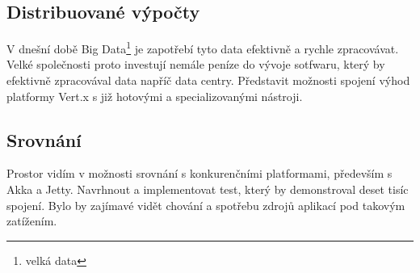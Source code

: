 \subsection{Distribuované výpočty}

V dnešní době Big Data\footnote{velká data} je zapotřebí tyto data efektivně a rychle zpracovávat. Velké společnosti proto investují nemále peníze do vývoje sotfwaru, který by efektivně zpracovával data napříč data centry. Představit možnosti spojení výhod platformy Vert.x s již hotovými a specializovanými nástroji.

\subsection{Srovnání}

Prostor vidím v možnosti srovnání s konkurenčními platformami, především s Akka a Jetty. Navrhnout a implementovat test, který by demonstroval deset tisíc spojení. Bylo by zajímavé vidět chování a spotřebu zdrojů aplikací pod takovým zatížením.